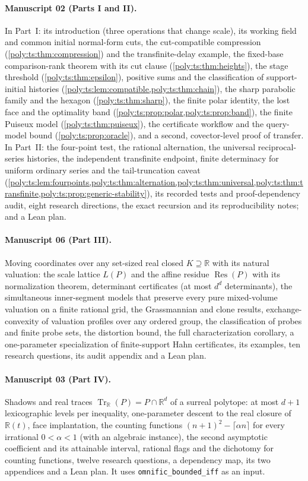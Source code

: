 \documentclass[11pt,a4paper]{article}
\numberwithin{equation}{section}
\theoremstyle{plain}
\newcommand{\R}{\mathbb R}
\newcommand{\Tr}{\operatorname{Tr}_{\R}}%
\newcommand{\Res}{\operatorname{Res}}
\newcommand{\tr}{\operatorname{tr}}%
\begin{document}
\paragraph{Manuscript 02 (Parts I and II).} In Part~I: its introduction
(three operations that change scale), its working field and common initial
normal-form cuts, the cut-compatible compression
(\cref{poly:ts:thm:compression}) and the transfinite-delay example, the
fixed-base comparison-rank theorem with its cut clause
(\cref{poly:ts:thm:heights}), the stage threshold
(\cref{poly:ts:thm:epsilon}), positive sums and the classification of
support-initial histories (\cref{poly:ts:lem:compatible,poly:ts:thm:chain}),
the sharp parabolic family and the hexagon (\cref{poly:ts:thm:sharp}), the
finite polar identity, the lost face and the optimality band
(\cref{poly:ts:prop:polar,poly:ts:prop:band}), the finite Puiseux model
(\cref{poly:ts:thm:puiseux}), the certificate workflow and the query-model
bound (\cref{poly:ts:prop:oracle}), and a second, covector-level proof of
transfer. In Part~II: the four-point test, the rational alternation, the
universal reciprocal-series histories, the independent transfinite
endpoint, finite determinacy for uniform ordinary series and the
tail-truncation caveat
(\cref{poly:ts:lem:fourpoints,poly:ts:thm:alternation,poly:ts:thm:universal,poly:ts:thm:transfinite,poly:ts:prop:generic-stability}),
its recorded tests and proof-dependency audit, eight research directions,
the exact recursion and its reproducibility notes; and a Lean plan.

\paragraph{Manuscript 06 (Part III).} Moving coordinates over any
set-sized real closed $K\supseteq\R$ with its natural valuation: the scale
lattice $L(P)$ and the affine residue $\Res(P)$ with its normalization
theorem, determinant certificates (at most $d^d$ determinants), the
simultaneous inner-segment models that preserve every pure mixed-volume
valuation on a finite rational grid, the Grassmannian and clone results,
exchange-convexity of valuation profiles over any ordered group, the
classification of probes and finite probe sets, the distortion bound, the
full characterization corollary, a one-parameter specialization of
finite-support Hahn certificates, its examples, ten research questions, its
audit appendix and a Lean plan.

\paragraph{Manuscript 03 (Part IV).} Shadows and real traces
$\Tr(P)=P\cap\R^d$ of a surreal polytope: at most $d+1$ lexicographic levels
per inequality, one-parameter descent to the real closure of $\R(t)$,
face implantation, the counting functions $(n+1)^2-\lceil\alpha n\rceil$
for every irrational $0<\alpha<1$ (with an algebraic instance), the second
asymptotic coefficient and its attainable interval, rational flags and the
dichotomy for counting functions, twelve research
questions, a dependency map, its two appendices and a Lean plan. It uses
\texttt{omnific\_bounded\_iff} as an input.
\end{document}
